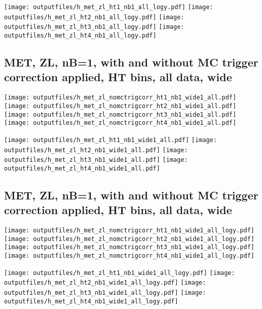\documentclass[11pt]{article}
\begin{document}
    \noindent
     \texttt{[image: outputfiles/h\_met\_zl\_ht1\_nb1\_all\_logy.pdf]}
     \texttt{[image: outputfiles/h\_met\_zl\_ht2\_nb1\_all\_logy.pdf]}
     \texttt{[image: outputfiles/h\_met\_zl\_ht3\_nb1\_all\_logy.pdf]}
     \texttt{[image: outputfiles/h\_met\_zl\_ht4\_nb1\_all\_logy.pdf]}


    \clearpage
     \subsection{ MET, ZL, nB=1, with and without MC trigger correction applied, HT bins, all data, wide}

    \noindent
     \texttt{[image: outputfiles/h\_met\_zl\_nomctrigcorr\_ht1\_nb1\_wide1\_all.pdf]}
     \texttt{[image: outputfiles/h\_met\_zl\_nomctrigcorr\_ht2\_nb1\_wide1\_all.pdf]}
     \texttt{[image: outputfiles/h\_met\_zl\_nomctrigcorr\_ht3\_nb1\_wide1\_all.pdf]}
     \texttt{[image: outputfiles/h\_met\_zl\_nomctrigcorr\_ht4\_nb1\_wide1\_all.pdf]}

    \noindent
     \texttt{[image: outputfiles/h\_met\_zl\_ht1\_nb1\_wide1\_all.pdf]}
     \texttt{[image: outputfiles/h\_met\_zl\_ht2\_nb1\_wide1\_all.pdf]}
     \texttt{[image: outputfiles/h\_met\_zl\_ht3\_nb1\_wide1\_all.pdf]}
     \texttt{[image: outputfiles/h\_met\_zl\_ht4\_nb1\_wide1\_all.pdf]}

    \clearpage
     \subsection{ MET, ZL, nB=1, with and without MC trigger correction applied, HT bins, all data, wide}

    \noindent
     \texttt{[image: outputfiles/h\_met\_zl\_nomctrigcorr\_ht1\_nb1\_wide1\_all\_logy.pdf]}
     \texttt{[image: outputfiles/h\_met\_zl\_nomctrigcorr\_ht2\_nb1\_wide1\_all\_logy.pdf]}
     \texttt{[image: outputfiles/h\_met\_zl\_nomctrigcorr\_ht3\_nb1\_wide1\_all\_logy.pdf]}
     \texttt{[image: outputfiles/h\_met\_zl\_nomctrigcorr\_ht4\_nb1\_wide1\_all\_logy.pdf]}


    \noindent
     \texttt{[image: outputfiles/h\_met\_zl\_ht1\_nb1\_wide1\_all\_logy.pdf]}
     \texttt{[image: outputfiles/h\_met\_zl\_ht2\_nb1\_wide1\_all\_logy.pdf]}
     \texttt{[image: outputfiles/h\_met\_zl\_ht3\_nb1\_wide1\_all\_logy.pdf]}
     \texttt{[image: outputfiles/h\_met\_zl\_ht4\_nb1\_wide1\_all\_logy.pdf]}
\end{document}
